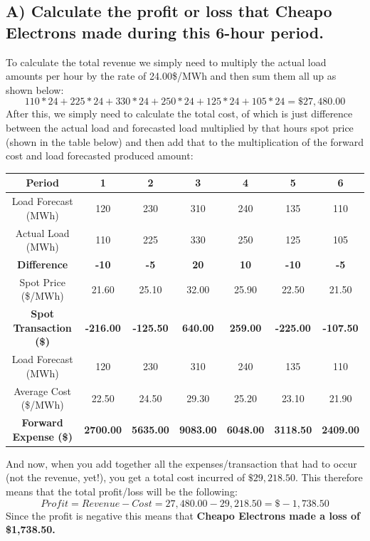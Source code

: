 \documentclass{article}
\begin{document}
\subsection{A) Calculate the profit or loss that Cheapo Electrons made during this 6-hour period.}
To calculate the total revenue we simply need to multiply the actual load amounts per hour by the rate of 24.00\$/MWh and then sum them all up as shown below:
$$ 110*24 + 225*24 + 330*24 + 250*24 + 125*24 + 105*24 = \$27,480.00 $$
After this, we simply need to calculate the total cost, of which is just difference between the actual load and forecasted load multiplied by that hours spot price (shown in the table below) and then add that to the multiplication of the forward cost and load forecasted produced amount:
\begin{center}
	\begin{tabular}{||c|c|c|c|c|c|c||}
		\hline
		Period                & 1    & 2    & 3    & 4    & 5    & 6    \\
		\hline \hline
		Load Forecast (MWh)   & 120  & 230  & 310  & 240  & 135  & 110  \\
		\hline
		Actual Load (MWh)     & 110  & 225  & 330  & 250  & 125  & 105  \\
		\hline
		\textbf{Difference} & \textbf{-10} & \textbf{-5} & \textbf{20} & \textbf{10} & \textbf{-10} & \textbf{-5} \\
		\hline \hline
		Spot Price (\$/MWh)   & 21.60 & 25.10 & 32.00   & 25.90 & 22.50 & 21.50 \\
		\hline
		\textbf{Spot Transaction (\$)} & \textbf{-216.00} & \textbf{-125.50} & \textbf{640.00} & \textbf{259.00} & \textbf{-225.00} & \textbf{-107.50} \\
		\hline \hline
		Load Forecast (MWh)   & 120  & 230  & 310  & 240  & 135  & 110  \\
		\hline
		Average Cost (\$/MWh) & 22.50 & 24.50 & 29.30 & 25.20 & 23.10 & 21.90 \\
		\hline
		\textbf{Forward Expense (\$)} & \textbf{2700.00} & \textbf{5635.00} & \textbf{9083.00} & \textbf{6048.00} & \textbf{3118.50} & \textbf{2409.00} \\
		\hline
	\end{tabular}
\end{center}
And now, when you add together all the expenses/transaction that had to occur (not the revenue, yet!), you get a total cost incurred of $\$29,218.50$. This therefore means that the total profit/loss will be the following:
$$ Profit = Revenue - Cost = 27,480.00 - 29,218.50 = \$-1,738.50 $$
Since the profit is negative this means that \textbf{Cheapo Electrons made a loss of \$1,738.50.}
\end{document}
